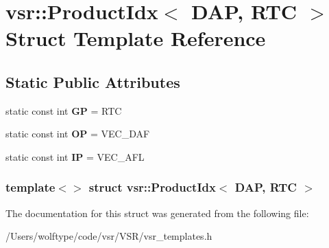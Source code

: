 \hypertarget{structvsr_1_1_product_idx_3_01_d_a_p_00_01_r_t_c_01_4}{\section{vsr\-:\-:Product\-Idx$<$ D\-A\-P, R\-T\-C $>$ Struct Template Reference}
\label{structvsr_1_1_product_idx_3_01_d_a_p_00_01_r_t_c_01_4}
}
\subsection*{Static Public Attributes}
\begin{DoxyCompactItemize}
\item 
\hypertarget{structvsr_1_1_product_idx_3_01_d_a_p_00_01_r_t_c_01_4_ad2bcf50518213353357ccd50185e1797}{static const int {\bfseries G\-P} = R\-T\-C}\label{structvsr_1_1_product_idx_3_01_d_a_p_00_01_r_t_c_01_4_ad2bcf50518213353357ccd50185e1797}

\item 
\hypertarget{structvsr_1_1_product_idx_3_01_d_a_p_00_01_r_t_c_01_4_a94cb69da52ebb25f5825e00e87492f63}{static const int {\bfseries O\-P} = V\-E\-C\-\_\-\-D\-A\-F}\label{structvsr_1_1_product_idx_3_01_d_a_p_00_01_r_t_c_01_4_a94cb69da52ebb25f5825e00e87492f63}

\item 
\hypertarget{structvsr_1_1_product_idx_3_01_d_a_p_00_01_r_t_c_01_4_abbd2a83ba5405780c2b31b1cef654195}{static const int {\bfseries I\-P} = V\-E\-C\-\_\-\-A\-F\-L}\label{structvsr_1_1_product_idx_3_01_d_a_p_00_01_r_t_c_01_4_abbd2a83ba5405780c2b31b1cef654195}

\end{DoxyCompactItemize}
\subsubsection*{template$<$$>$ struct vsr\-::\-Product\-Idx$<$ D\-A\-P, R\-T\-C $>$}



The documentation for this struct was generated from the following file\-:\begin{DoxyCompactItemize}
\item 
/\-Users/wolftype/code/vsr/\-V\-S\-R/vsr\-\_\-templates.\-h\end{DoxyCompactItemize}
